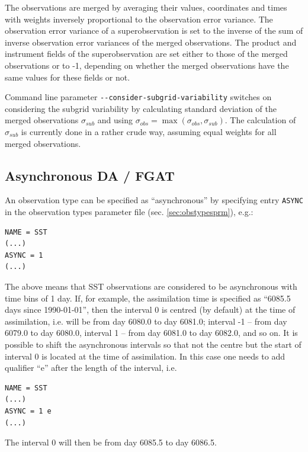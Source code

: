 \documentclass[11pt]{report}
\begin{document}
The observations are merged by averaging their values, coordinates and times with weights inversely proportional to the observation error variance.
The observation error variance of a superobservation is set to the inverse of the sum of inverse observation error variances of the merged observations.
The product and instrument fields of the superobservation are set either to those of the merged observations or to -1, depending on whether the merged observations have the same values for these fields or not.

Command line parameter \verb|--consider-subgrid-variability| switches on considering the subgrid variability by calculating standard deviation of the merged observations $\sigma\!_{sub}$ and using $\sigma\!_{obs} = \max(\sigma\!_{obs}, \sigma\!_{sub})$.
The calculation of $\sigma\!_{sub}$ is currently done in a rather crude way, assuming equal weights for all merged observations.

\subsection{Asynchronous DA / FGAT}
\label{sec:async}

An observation type can be specified as ``asynchronous'' by specifying entry \verb|ASYNC| in the observation types parameter file (sec. \ref{sec:obstypesprm}), e.g.:
\begin{Verbatim}[frame=single,fontsize=\footnotesize]
NAME = SST
(...)
ASYNC = 1
(...)
\end{Verbatim}
The above means that SST observations are considered to be asynchronous with time bins of 1 day.
If, for example, the assimilation time is specified as ``6085.5 days since 1990-01-01'', then the interval 0 is centred (by default) at the time of assimilation, i.e. will be from day 6080.0 to day 6081.0; interval -1 -- from day 6079.0 to day 6080.0, interval 1 -- from day 6081.0 to day 6082.0, and so on.
It is possible to shift the asynchronous intervals so that not the centre but the start of interval 0 is located at the time of assimilation.
In this case one needs to add qualifier ``e'' after the length of the interval, i.e.
\begin{Verbatim}[frame=single,fontsize=\footnotesize]
NAME = SST
(...)
ASYNC = 1 e
(...)
\end{Verbatim}
The interval 0 will then be from day 6085.5 to day 6086.5.
\end{document}
